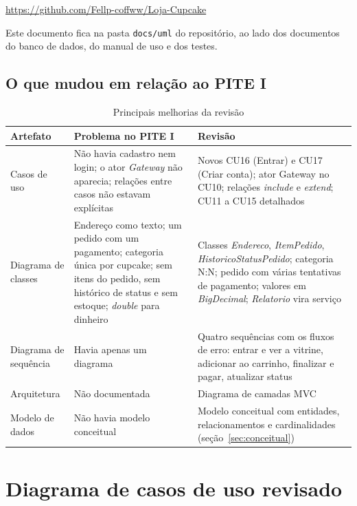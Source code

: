 \documentclass[12pt]{article}
\begin{document}
\begin{center}\url{https://github.com/Fellp-coffww/Loja-Cupcake}\end{center}

Este documento fica na pasta \texttt{docs/uml} do repositório, ao lado dos documentos do banco de dados, do manual de uso e dos testes.

\subsection{O que mudou em relação ao PITE I}

\begin{table}[H]
\centering\small\renewcommand{\arraystretch}{1.3}
\begin{tabular}{|p{3.2cm}|p{5.2cm}|p{5.0cm}|}
\hline
\rowcolor{gray!30} \textbf{Artefato} & \textbf{Problema no PITE I} & \textbf{Revisão} \\ \hline
Casos de uso & Não havia cadastro nem login; o ator \textit{Gateway} não aparecia; relações entre casos não estavam explícitas & Novos CU16 (Entrar) e CU17 (Criar conta); ator Gateway no CU10; relações \textit{include} e \textit{extend}; CU11 a CU15 detalhados \\ \hline
Diagrama de classes & Endereço como texto; um pedido com um pagamento; categoria única por cupcake; sem itens do pedido, sem histórico de status e sem estoque; \textit{double} para dinheiro & Classes \textit{Endereco}, \textit{ItemPedido}, \textit{HistoricoStatusPedido}; categoria N:N; pedido com várias tentativas de pagamento; valores em \textit{BigDecimal}; \textit{Relatorio} vira serviço \\ \hline
Diagrama de sequência & Havia apenas um diagrama & Quatro sequências com os fluxos de erro: entrar e ver a vitrine, adicionar ao carrinho, finalizar e pagar, atualizar status \\ \hline
Arquitetura & Não documentada & Diagrama de camadas MVC \\ \hline
Modelo de dados & Não havia modelo conceitual & Modelo conceitual com entidades, relacionamentos e cardinalidades (seção~\ref{sec:conceitual}) \\ \hline
\end{tabular}
\caption{Principais melhorias da revisão}
\end{table}

\section{Diagrama de casos de uso revisado}
\end{document}
